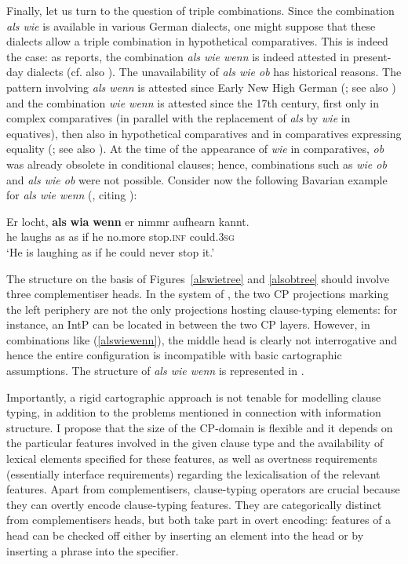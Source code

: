 Finally, let us turn to the question of triple combinations. Since the combination \textit{als wie} is available in various German dialects, one might suppose that these dialects allow a triple combination in hypothetical comparatives. This is indeed the case: as \citet[279]{jaeger2016habil} reports, the combination \textit{als wie wenn} is indeed attested in present-day dialects (cf. also \citealt[62]{thurmair2001}). The unavailability of \textit{als wie ob} has historical reasons. The pattern involving \textit{als wenn} is attested since Early New High German (\citealt[178]{eggs2006}; see also \citealt{jaeger2010}) and the combination \textit{wie wenn} is attested since the 17th century, first only in complex comparatives (in parallel with the replacement of \textit{als} by \textit{wie} in equatives), then also in hypothetical comparatives  and in comparatives expressing equality (\citealt[178]{eggs2006}; see also \citealt{jaeger2010}). At the time of the appearance of \textit{wie} in comparatives, \textit{ob} was already obsolete in conditional clauses; hence, combinations such as \textit{wie ob} and \textit{als wie ob} were not possible. Consider now the following Bavarian example for \textit{als wie wenn} (\citealt[280, ex. 582]{jaeger2016habil}, citing \citealt[19]{alber1994}):

\ea \gll Er locht, \textbf{als} \textbf{wia} \textbf{wenn} er nimmr aufhearn kannt. \label{alswiewenn}\\
he laughs as as if he no.more stop.\textsc{inf} could.\textsc{3sg}\\
\glt `He is laughing as if he could never stop it.'
\z

The structure on the basis of Figures~\ref{alswietree} and \ref{alsobtree} should involve three complementiser heads. In the system of \citet{rizzi1997, rizzi2004}, the two CP projections marking the left periphery are not the only projections hosting clause-typing elements: for instance, an IntP can be located in between the two CP layers. However, in combinations like (\ref{alswiewenn}), the middle head is clearly not interrogative and hence the entire configuration is incompatible with basic cartographic assumptions. The structure of \textit{als wie wenn} is represented in .

Importantly, a rigid cartographic approach is not tenable for modelling clause typing, in addition to the problems mentioned in connection with information structure. I propose that the size of the CP-domain is flexible and it depends on the particular features involved in the given clause type and the availability of lexical elements specified for these features, as well as overtness requirements (essentially interface requirements) regarding the lexicalisation of the relevant features. Apart from complementisers, clause-typing operators are crucial because they can overtly encode clause-typing features. They are categorically distinct from complementisers heads, but both take part in overt encoding: features of a head can be checked off either by inserting an element into the head or by inserting a phrase into the specifier.\largerpage

